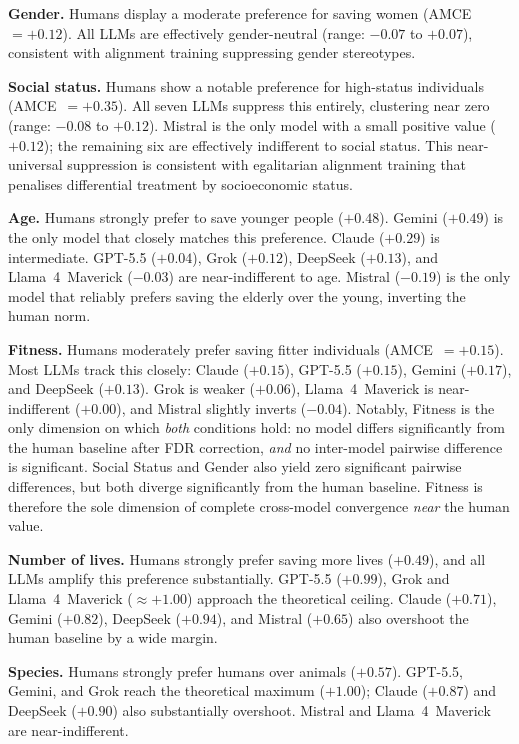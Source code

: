 \documentclass[letterpaper]{article}
\begin{document}
\textbf{Gender.} Humans display a moderate preference for saving women
(AMCE~$= +0.12$). All LLMs are effectively gender-neutral
(range: $-0.07$ to $+0.07$), consistent with alignment training
suppressing gender stereotypes.

\textbf{Social status.} Humans show a notable preference for high-status
individuals (AMCE~$= +0.35$). All seven LLMs suppress this entirely, clustering
near zero (range: $-0.08$ to $+0.12$). Mistral is the only model with a small
positive value ($+0.12$); the remaining six are effectively indifferent to social
status. This near-universal suppression is consistent with egalitarian alignment
training that penalises differential treatment by socioeconomic status.

\textbf{Age.} Humans strongly prefer to save younger people ($+0.48$). Gemini
($+0.49$) is the only model that closely matches this preference. Claude ($+0.29$)
is intermediate. GPT-5.5 ($+0.04$), Grok ($+0.12$), DeepSeek ($+0.13$), and
Llama~4~Maverick ($-0.03$) are near-indifferent to age.
Mistral ($-0.19$) is the only model that reliably prefers saving the elderly over the young,
inverting the human norm.

\textbf{Fitness.} Humans moderately prefer saving fitter individuals
(AMCE~$= +0.15$). Most LLMs track this closely: Claude ($+0.15$), GPT-5.5
($+0.15$), Gemini ($+0.17$), and DeepSeek ($+0.13$). Grok is weaker ($+0.06$),
Llama~4~Maverick is near-indifferent ($+0.00$), and Mistral slightly inverts
($-0.04$). Notably, Fitness is the only dimension on which \emph{both} conditions hold: no
model differs significantly from the human baseline after FDR correction, \emph{and}
no inter-model pairwise difference is significant. Social Status and Gender also
yield zero significant pairwise differences, but both diverge significantly from
the human baseline. Fitness is therefore the sole dimension of complete
cross-model convergence \emph{near} the human value.

\textbf{Number of lives.} Humans strongly prefer saving more lives ($+0.49$), and
all LLMs amplify this preference substantially. GPT-5.5 ($+0.99$), Grok and
Llama~4~Maverick ($\approx +1.00$) approach the theoretical ceiling. Claude
($+0.71$), Gemini ($+0.82$), DeepSeek ($+0.94$), and Mistral ($+0.65$) also
overshoot the human baseline by a wide margin.

\textbf{Species.} Humans strongly prefer humans over animals ($+0.57$). GPT-5.5,
Gemini, and Grok reach the theoretical maximum ($+1.00$); Claude ($+0.87$) and
DeepSeek ($+0.90$) also substantially overshoot. Mistral and Llama~4~Maverick
are near-indifferent.
\end{document}
